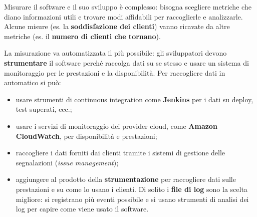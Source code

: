 Misurare il software e il suo sviluppo è complesso: bisogna scegliere
metriche che diano informazioni utili e trovare modi affidabili per
raccoglierle e analizzarle. Alcune misure (es. la \textbf{soddisfazione
dei clienti}) vanno ricavate da altre metriche (es. il \textbf{numero di
clienti che tornano}).

La misurazione va automatizzata il più possibile: gli sviluppatori
devono \textbf{strumentare} il software perché raccolga dati su se
stesso e usare un sistema di monitoraggio per le prestazioni e la
disponibilità. Per raccogliere dati in automatico si può:

\begin{itemize}
\tightlist
\item
  usare strumenti di continuous integration come \textbf{Jenkins} per i
  dati su deploy, test superati, ecc.;
\item
  usare i servizi di monitoraggio dei provider cloud, come
  \textbf{Amazon CloudWatch}, per disponibilità e prestazioni;
\item
  raccogliere i dati forniti dai clienti tramite i sistemi di gestione
  delle segnalazioni (\emph{issue management});
\item
  aggiungere al prodotto della \textbf{strumentazione} per raccogliere
  dati sulle prestazioni e su come lo usano i clienti. Di solito i
  \textbf{file di log} sono la scelta migliore: si registrano più eventi
  possibile e si usano strumenti di analisi dei log per capire come
  viene usato il software.
\end{itemize}
